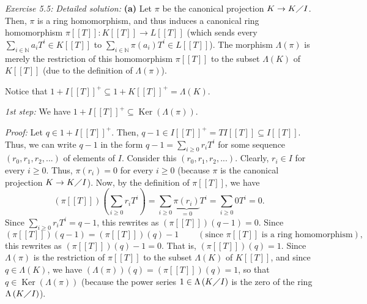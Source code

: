 \documentclass[numbers=enddot,12pt,final,onecolumn,notitlepage]{scrartcl}%
\begin{document}
\textit{Exercise 5.5:} \textit{Detailed solution:} \textbf{(a)} Let $\pi$ be
the canonical projection $K\rightarrow K\diagup I$. Then, $\pi$ is a ring
homomorphism, and thus induces a canonical ring homomorphism $\pi\left[
\left[  T\right]  \right]  :K\left[  \left[  T\right]  \right]  \rightarrow
L\left[  \left[  T\right]  \right]  $ (which sends every $\sum\limits_{i\in
\mathbb{N}}a_{i}T^{i}\in K\left[  \left[  T\right]  \right]  $ to
$\sum\limits_{i\in\mathbb{N}}\pi\left(  a_{i}\right)  T^{i}\in L\left[
\left[  T\right]  \right]  $). The morphism $\Lambda\left(  \pi\right)  $ is
merely the restriction of this homomorphism $\pi\left[  \left[  T\right]
\right]  $ to the subset $\Lambda\left(  K\right)  $ of $K\left[  \left[
T\right]  \right]  $ (due to the definition of $\Lambda\left(  \pi\right)  $).

Notice that $1+I\left[  \left[  T\right]  \right]  ^{+}\subseteq1+K\left[
\left[  T\right]  \right]  ^{+}=\Lambda\left(  K\right)  $.

\textit{1st step:} We have $1+I\left[  \left[  T\right]  \right]
^{+}\subseteq\operatorname*{Ker}\left(  \Lambda\left(  \pi\right)  \right)  $.

\textit{Proof:} Let $q\in1+I\left[  \left[  T\right]  \right]  ^{+}$. Then,
$q-1\in I\left[  \left[  T\right]  \right]  ^{+}=TI\left[  \left[  T\right]
\right]  \subseteq I\left[  \left[  T\right]  \right]  $. Thus, we can write
$q-1$ in the form $q-1=\sum\limits_{i\geq0}r_{i}T^{i}$ for some sequence
$\left(  r_{0},r_{1},r_{2},...\right)  $ of elements of $I$. Consider this
$\left(  r_{0},r_{1},r_{2},...\right)  $. Clearly, $r_{i}\in I$ for every
$i\geq0$. Thus, $\pi\left(  r_{i}\right)  =0$ for every $i\geq0$ (because
$\pi$ is the canonical projection $K\rightarrow K\diagup I$). Now, by the
definition of $\pi\left[  \left[  T\right]  \right]  $, we have%
\[
\left(  \pi\left[  \left[  T\right]  \right]  \right)  \left(  \sum
\limits_{i\geq0}r_{i}T^{i}\right)  =\sum\limits_{i\geq0}\underbrace{\pi\left(
r_{i}\right)  }_{=0}T^{i}=\sum\limits_{i\geq0}0T^{i}=0.
\]
Since $\sum\limits_{i\geq0}r_{i}T^{i}=q-1$, this rewrites as $\left(
\pi\left[  \left[  T\right]  \right]  \right)  \left(  q-1\right)  =0$. Since%
\[
\left(  \pi\left[  \left[  T\right]  \right]  \right)  \left(  q-1\right)
=\left(  \pi\left[  \left[  T\right]  \right]  \right)  \left(  q\right)
-1\ \ \ \ \ \ \ \ \ \ \left(  \text{since }\pi\left[  \left[  T\right]
\right]  \text{ is a ring homomorphism}\right)  ,
\]
this rewrites as $\left(  \pi\left[  \left[  T\right]  \right]  \right)
\left(  q\right)  -1=0$. That is, $\left(  \pi\left[  \left[  T\right]
\right]  \right)  \left(  q\right)  =1$. Since $\Lambda\left(  \pi\right)  $
is the restriction of $\pi\left[  \left[  T\right]  \right]  $ to the subset
$\Lambda\left(  K\right)  $ of $K\left[  \left[  T\right]  \right]  $, and
since $q\in\Lambda\left(  K\right)  $, we have $\left(  \Lambda\left(
\pi\right)  \right)  \left(  q\right)  =\left(  \pi\left[  \left[  T\right]
\right]  \right)  \left(  q\right)  =1$, so that $q\in\operatorname*{Ker}%
\left(  \Lambda\left(  \pi\right)  \right)  $ (because the power series
$1\in\Lambda\left(  K\diagup I\right)  $ is the zero of the ring
$\Lambda\left(  K\diagup I\right)  $).
\end{document}
